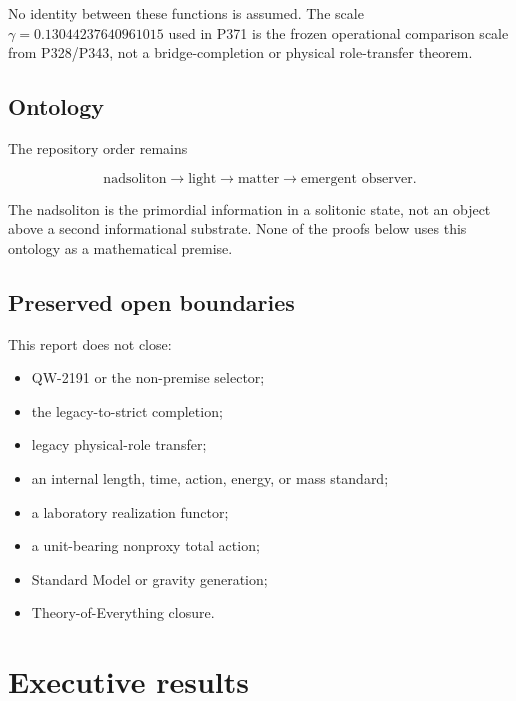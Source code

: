 \documentclass[11pt,a4paper,openany]{report}
\begin{document}
No identity between these functions is assumed. The scale \(\gamma=0.13044237640961015\) used in P371 is the frozen operational comparison scale from P328/\allowbreak{}P343, not a bridge-completion or physical role-transfer theorem.

\section{Ontology}

The repository order remains

\[
\text{nadsoliton}
\longrightarrow
\text{light}
\longrightarrow
\text{matter}
\longrightarrow
\text{emergent observer}.
\]

The nadsoliton is the primordial information in a solitonic state, not an object above a second informational substrate. None of the proofs below uses this ontology as a mathematical premise.

\section{Preserved open boundaries}

This report does not close:

\begin{itemize}
\item 
QW-2191 or the non-premise selector;

\item 
the legacy-to-strict completion;

\item 
legacy physical-role transfer;

\item 
an internal length, time, action, energy, or mass standard;

\item 
a laboratory realization functor;

\item 
a unit-bearing nonproxy total action;

\item 
Standard Model or gravity generation;

\item 
Theory-of-Everything closure.

\end{itemize}

\chapter{Executive results}
\end{document}

